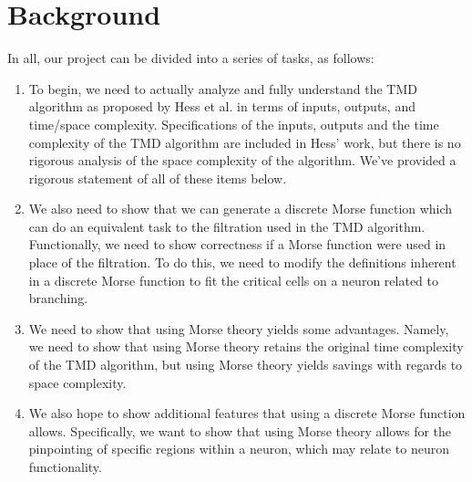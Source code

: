 \documentclass[11pt]{article}
\begin{document}
\maketitle
\section*{Background}
In all, our project can be divided into a series of tasks, as follows:
\begin{enumerate}
	\item To begin, we need to actually analyze and fully understand the TMD algorithm
		as proposed by Hess et al. in terms of inputs, outputs, and time/space complexity. 
		Specifications of the inputs, outputs and the time complexity of the TMD algorithm are
		included in Hess' work, but there is no rigorous analysis of the space complexity of
		the algorithm. We've provided a rigorous statement of all of these items below.
	\item We also need to show that we can generate a discrete Morse function which can do
		an equivalent task to the filtration used in the TMD algorithm. Functionally, we 
		need to show correctness if a Morse function were used in place of the filtration.
		To do this, we need to modify the definitions inherent in a discrete Morse
		function to fit the critical cells on a neuron related to branching.
	\item We need to show that using Morse theory yields some advantages. Namely,
		we need to show that using Morse theory retains the original time complexity of the
		TMD algorithm, but using Morse theory yields savings with regards to space complexity.
	\item We also hope to show additional features that using a discrete Morse function
		allows. Specifically, we want to show that using Morse theory allows for the pinpointing
		of specific regions within a neuron, which may relate to neuron functionality.
\end{enumerate}
\end{document}
